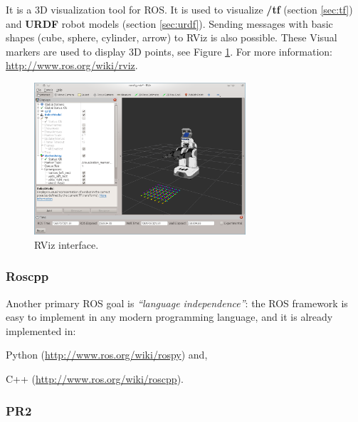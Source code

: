 It is a 3D visualization tool for ROS. It is used to visualize \textbf{/tf} (section \ref{sec:tf}) and \textbf{URDF} robot models (section \ref{sec:urdf}). Sending messages with basic shapes (cube, sphere, cylinder, arrow) to RViz is also possible. These Visual markers are used to display 3D points, see Figure \ref{fig:rviz}. For more information: \url{http://www.ros.org/wiki/rviz}.
\begin{figure}[!htbp]
 \centering
 \includegraphics[width=0.7\textwidth]{images/screenshots/rviz.png}
 \caption{RViz interface.}
 \label{fig:rviz}
\end{figure}

\vspace*{-2ex}
\subsubsection{Roscpp}
\label{sec:roscpp}

Another primary ROS goal is \textit{``language independence''}: the ROS framework is easy to implement in any modern programming language, and it is already implemented in:
\begin{itemize*}
 \item Python (\url{http://www.ros.org/wiki/rospy}) and,
 \item C++ (\url{http://www.ros.org/wiki/roscpp}).
\end{itemize*}

\subsubsection{PR2}
\label{sec:PR2}

